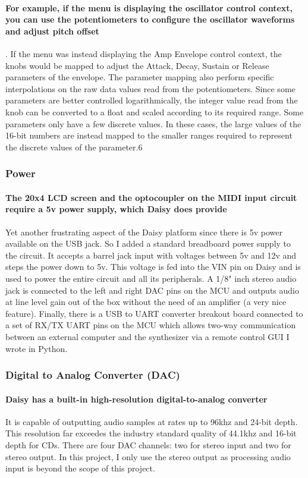 \documentclass[acmlarge,screen]{acmart}
\begin{document}
	\paragraph{For example, if the menu is displaying the oscillator control context, you can use the potentiometers to configure the oscillator waveforms and adjust pitch offset}. If the menu was instead displaying the Amp Envelope control context, the knobs would be mapped to adjust the Attack, Decay, Sustain or Release parameters of the envelope. The parameter mapping also perform specific interpolations on the raw data values read from the potentiometers. Since some parameters are better controlled logarithmically, the integer value read from the knob can be converted to a float and scaled according to its required range. Some parameters only have a few discrete values. In these cases, the large values of the 16-bit numbers are instead mapped to the smaller ranges required to represent the discrete values of the parameter.6

	\subsubsection{Power}
	\paragraph{The 20x4 LCD screen and the optocoupler on the MIDI input circuit require a 5v power supply, which Daisy does provide} Yet another frustrating aspect of the Daisy platform since there is 5v power available on the USB jack. So I added a standard breadboard power supply to the circuit. It accepts a barrel jack input with voltages between 5v and 12v and steps the power down to 5v. This voltage is fed into the VIN pin on Daisy and is used to power the entire circuit and all its peripherals. A 1/8" inch stereo audio jack is connected to the left and right DAC pins on the MCU and outputs audio at line level gain out of the box without the need of an amplifier (a very nice feature). Finally, there is a USB to UART converter breakout board connected to a set of RX/TX UART pins on the MCU which allows two-way communication between an external computer and the synthesizer via a remote control GUI I wrote in Python.
	
	\subsubsection{Digital to Analog Converter (DAC)} 
	\paragraph{Daisy has a built-in high-resolution digital-to-analog converter} It is capable of outputting audio samples at rates up to 96khz and 24-bit depth. This resolution far exceedes the industry standard quality of 44.1khz and 16-bit depth for CDs. There are four DAC channels: two for stereo input and two for stereo output. In this project, I only use the stereo output as processing audio input is beyond the scope of this project.
\end{document}
